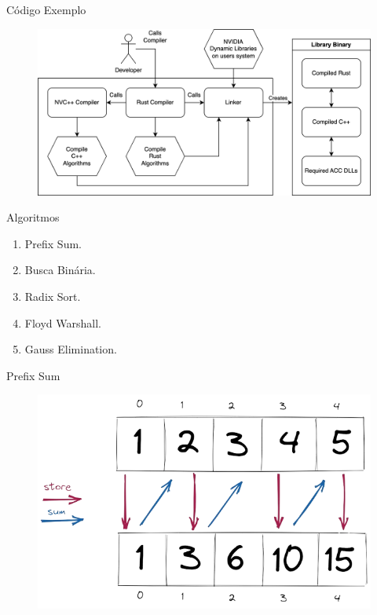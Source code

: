 \begin{frame}{Código Exemplo}
    \begin{figure}
        \centering
        \includegraphics[width=\textwidth]{Figuras/TCC Compilacao.png}
    \end{figure}
\end{frame}

\begin{frame}{Algoritmos}
    \begin{enumerate}
        \item Prefix Sum.
        \item Busca Binária.
        \item Radix Sort.
        \item Floyd Warshall.
        \item Gauss Elimination.
    \end{enumerate}
\end{frame}

\begin{frame}{Prefix Sum}
    \begin{figure}
        \centering
        \includegraphics[width=\textwidth]{Figuras/PrefixSum.png}
    \end{figure}
\end{frame}


